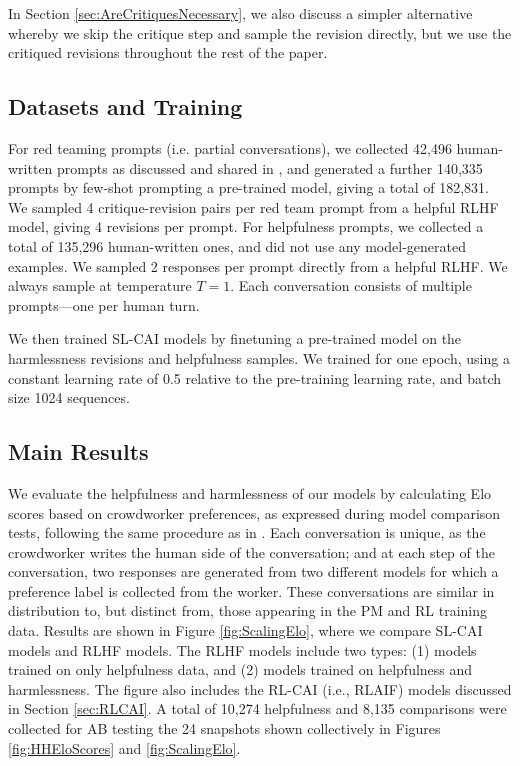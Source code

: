 In Section \ref{sec:AreCritiquesNecessary}, we also discuss a simpler alternative whereby we skip the critique step and sample the revision directly, but we use the critiqued revisions throughout the rest of the paper.

\subsection{Datasets and Training}
\label{sec:SLCAIDatasets}

For red teaming prompts (i.e. partial conversations), we collected 42,496 human-written prompts as discussed and shared in \cite{DeepRedTeaming}, and generated a further 140,335 prompts by few-shot prompting a pre-trained model, giving a total of 182,831. We sampled 4 critique-revision pairs per red team prompt from a helpful RLHF model, giving 4 revisions per prompt. For helpfulness prompts, we collected a total of 135,296 human-written ones, and did not use any model-generated examples. We sampled 2 responses per prompt directly from a helpful RLHF. We always sample at temperature $T=1$. Each conversation consists of multiple prompts---one per human turn.

We then trained SL-CAI models by finetuning a pre-trained model on the harmlessness revisions and helpfulness samples. We trained for one epoch, using a constant learning rate of 0.5 relative to the pre-training learning rate, and batch size 1024 sequences.

\subsection{Main Results}
\label{sec:SLResults}

We evaluate the helpfulness and harmlessness of our models by calculating Elo scores based on crowdworker preferences, as expressed during model comparison tests, following the same procedure as in \cite{bai2022training}. Each conversation is unique, as the crowdworker writes the human side of the conversation; and at each step of the conversation, two responses are generated from two different models for which a preference label is collected from the worker. These conversations are similar in distribution to, but distinct from, those appearing in the PM and RL training data. Results are shown in Figure \ref{fig:ScalingElo}, where we compare SL-CAI models and RLHF models. The RLHF models include two types: (1) models trained on only helpfulness data, and (2) models trained on helpfulness and harmlessness. The figure also includes the RL-CAI (i.e., RLAIF) models discussed in Section \ref{sec:RLCAI}. A total of 10,274 helpfulness and 8,135 comparisons were collected for AB testing the 24 snapshots shown collectively in Figures \ref{fig:HHEloScores} and \ref{fig:ScalingElo}.

